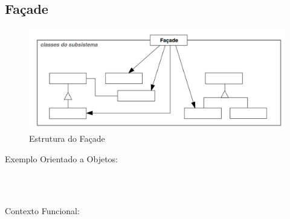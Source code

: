 \subsection{Façade}

\begin{figure}[htb]
	\caption{\label{fig_grafico}Estrutura do Façade}
	\begin{center}
	    \includegraphics[scale=0.5]{5_padroes-contexto-funcional/5.2_estruturais/5.2.5_facade/diagram.png}
	\end{center}
\end{figure}

Exemplo Orientado a Objetos:

\begin{lstlisting}[caption={Façade Orientado a Objetos},label=oofacade]



\end{lstlisting}

Contexto Funcional:


\begin{lstlisting}[caption={Façade Funcional},label=fpfacade]
    

    
\end{lstlisting}